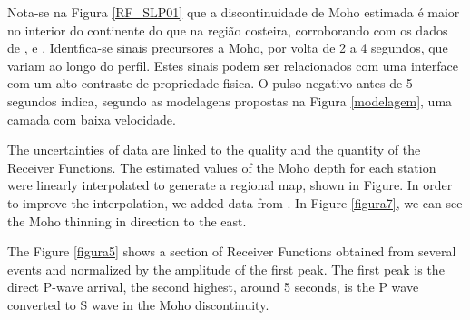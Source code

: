 

Nota-se na Figura \ref{RF_SLP01} que a discontinuidade de Moho estimada é maior no interior do continente do que na região costeira, corroborando com os dados de \cite{Assumpcao_America_2013}, \citep{Assumpcao_Brazil_2013} e \cite{van_der_meijde_gravity_2013} . Identfica-se sinais precursores a Moho, por volta de 2 a 4 segundos, que variam ao longo do perfil. Estes sinais podem ser relacionados com uma interface com um alto contraste de propriedade fisica. O pulso negativo antes de 5 segundos indica, segundo as modelagens propostas na Figura \ref{modelagem}, uma camada com baixa velocidade.



The uncertainties of data are linked to the quality and the quantity of the Receiver Functions. The estimated values of the Moho depth for each station were linearly interpolated to generate a regional map, shown in Figure. In order to improve the interpolation, we added data from \citep{assumpcao_crustal_2013}. In Figure \ref{figura7}, we can see the Moho thinning in direction to the east.

The Figure \ref{figura5} shows a section of Receiver Functions obtained from several events and normalized by the amplitude of the first peak. The first peak is the direct P-wave arrival, the second highest, around 5 seconds, is the P wave converted to S wave in the Moho discontinuity. 


